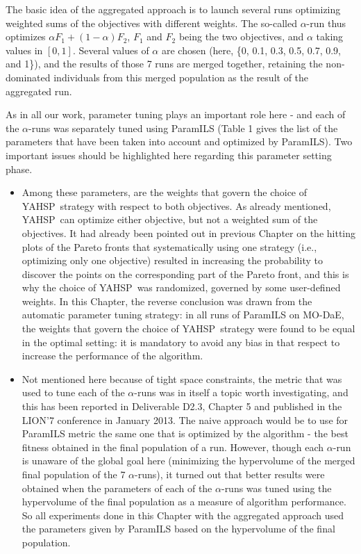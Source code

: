 \documentclass[english]{DESCARWINreport}
\newcounter{hyp}
\newcounter{defi}
\newcounter{con}
\def\YAHSP{{\sc YAHSP}}
\def\MODAE{{\sc MO-DaE}}
\begin{document}
The basic idea of the aggregated approach is to launch several runs optimizing weighted sums of the objectives with different weights. The so-called $\alpha$-run thus optimizes $\alpha F_1 + (1-\alpha) F_2$, $F_1$ and $F_2$ being the two objectives, and $\alpha$ taking values in $[0, 1]$. Several values of $\alpha$ are chosen (here, \{0, 0.1, 0.3, 0.5, 0.7, 0.9, and 1\}), and the results of those 7 runs are merged together, retaining the non-dominated individuals from this merged population as the result of the aggregated run.

As in all our work, parameter tuning plays an important role here - and each of the $\alpha$-runs was separately tuned using ParamILS (Table 1 gives the list of the parameters that have been taken into account and optimized by ParamILS). Two important issues should be highlighted here regarding this parameter setting phase.
\begin{itemize}
\item Among these parameters, are the weights that govern the choice of \YAHSP\ strategy with respect to both objectives. As already mentioned, \YAHSP\ can optimize either objective, but not a weighted sum of the objectives. It had already been pointed out in previous Chapter on the hitting plots of the Pareto fronts that systematically using one strategy (i.e., optimizing only one objective) resulted in increasing the probability to discover the points on the corresponding part of the Pareto front, and this is why the choice of \YAHSP\ was randomized, governed by some user-defined weights. In this Chapter, the reverse conclusion was drawn from the automatic parameter tuning strategy: in all runs of ParamILS on \MODAE, the weights that govern the choice of \YAHSP\ strategy were found to be equal in the optimal setting: it is mandatory to avoid any bias in that respect to increase the performance of the algorithm.
\item Not mentioned here because of tight space constraints, the metric that was used to tune each of the $\alpha$-runs was in itself a topic worth investigating, and this has been reported in Deliverable D2.3, Chapter 5 and published in the LION'7 conference in January 2013. The naive approach would be to use for ParamILS metric the same one that is optimized by the algorithm - the best fitness obtained in the final population of a run. However, though each $\alpha$-run is unaware of the global goal here (minimizing the hypervolume of the merged final population of the 7 $\alpha$-runs), it turned out that better results were obtained when the parameters of each of the $\alpha$-runs was tuned using the hypervolume of the final population as a measure of algorithm performance. So all experiments done in this Chapter with the aggregated approach used the parameters given by ParamILS based on the hypervolume of the final population.
\end{itemize}
\end{document}
